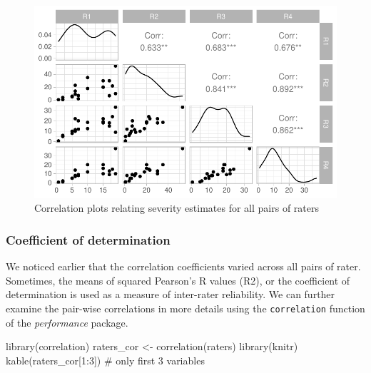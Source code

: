 \documentclass[
  letterpaper,
  DIV=11,
  numbers=noendperiod]{scrreprt}
\newenvironment{Shaded}{\begin{snugshade}}{\end{snugshade}}
\newcommand{\CommentTok}[1]{\textcolor[rgb]{0.37,0.37,0.37}{#1}}
\newcommand{\DecValTok}[1]{\textcolor[rgb]{0.68,0.00,0.00}{#1}}
\newcommand{\FunctionTok}[1]{\textcolor[rgb]{0.28,0.35,0.67}{#1}}
\newcommand{\NormalTok}[1]{\textcolor[rgb]{0.00,0.23,0.31}{#1}}
\newcommand{\OtherTok}[1]{\textcolor[rgb]{0.00,0.23,0.31}{#1}}
\newcommand{\SpecialCharTok}[1]{\textcolor[rgb]{0.37,0.37,0.37}{#1}}
\begin{document}
\begin{figure}[H]

{\centering \includegraphics{data-accuracy_files/figure-pdf/fig-correl-1.pdf}

}

\caption{\label{fig-correl}Correlation plots relating severity estimates
for all pairs of raters}

\end{figure}

\hypertarget{coefficient-of-determination}{%
\subsubsection{Coefficient of
determination}\label{coefficient-of-determination}}

We noticed earlier that the correlation coefficients varied across all
pairs of rater. Sometimes, the means of squared Pearson's R values (R2),
or the coefficient of determination is used as a measure of inter-rater
reliability. We can further examine the pair-wise correlations in more
details using the \texttt{correlation} function of the
\emph{performance} package.

\begin{Shaded}
\begin{Highlighting}[]
\FunctionTok{library}\NormalTok{(correlation)}
\NormalTok{raters\_cor }\OtherTok{\textless{}{-}} \FunctionTok{correlation}\NormalTok{(raters)}
\FunctionTok{library}\NormalTok{(knitr)}
\FunctionTok{kable}\NormalTok{(raters\_cor[}\DecValTok{1}\SpecialCharTok{:}\DecValTok{3}\NormalTok{]) }\CommentTok{\# only first 3 variables}
\end{Highlighting}
\end{Shaded}
\end{document}
